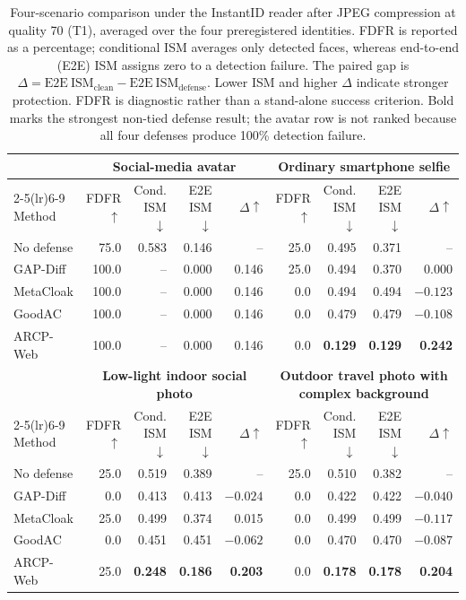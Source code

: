 \begin{table}[t]
\centering
\caption{Four-scenario comparison under the InstantID reader after JPEG
compression at quality 70 (T1), averaged over the four preregistered identities.
FDFR is reported as a percentage; conditional ISM averages only detected faces,
whereas end-to-end (E2E) ISM assigns zero to a detection failure.  The paired
gap is $\Delta=\mathrm{E2E\ ISM}_{\mathrm{clean}}-
\mathrm{E2E\ ISM}_{\mathrm{defense}}$.  Lower ISM and higher $\Delta$ indicate
stronger protection.  FDFR is diagnostic rather than a stand-alone success
criterion.  Bold marks the strongest non-tied defense result; the avatar row is
not ranked because all four defenses produce 100\% detection failure.}
\label{tab:web4-t1-scenarios}
\footnotesize
\renewcommand{\arraystretch}{1.16}
\setlength{\tabcolsep}{3.0pt}
\begin{tabular}{lrrrrrrrr}
\toprule
& \multicolumn{4}{c}{\textbf{Social-media avatar}} &
  \multicolumn{4}{c}{\textbf{Ordinary smartphone selfie}} \\
\cmidrule(lr){2-5}\cmidrule(lr){6-9}
Method & FDFR $\uparrow$ & Cond. ISM $\downarrow$ & E2E ISM $\downarrow$ & $\Delta\uparrow$
       & FDFR $\uparrow$ & Cond. ISM $\downarrow$ & E2E ISM $\downarrow$ & $\Delta\uparrow$ \\
\midrule
No defense & 75.0 & 0.583 & 0.146 & -- & 25.0 & 0.495 & 0.371 & -- \\
GAP-Diff   & 100.0 & -- & 0.000 & 0.146 & 25.0 & 0.494 & 0.370 & 0.000 \\
MetaCloak  & 100.0 & -- & 0.000 & 0.146 &  0.0 & 0.494 & 0.494 & $-0.123$ \\
GoodAC     & 100.0 & -- & 0.000 & 0.146 &  0.0 & 0.479 & 0.479 & $-0.108$ \\
ARCP-Web   & 100.0 & -- & 0.000 & 0.146 &  0.0 & \textbf{0.129} & \textbf{0.129} & \textbf{0.242} \\
\midrule
& \multicolumn{4}{c}{\textbf{Low-light indoor social photo}} &
  \multicolumn{4}{c}{\textbf{Outdoor travel photo with complex background}} \\
\cmidrule(lr){2-5}\cmidrule(lr){6-9}
Method & FDFR $\uparrow$ & Cond. ISM $\downarrow$ & E2E ISM $\downarrow$ & $\Delta\uparrow$
       & FDFR $\uparrow$ & Cond. ISM $\downarrow$ & E2E ISM $\downarrow$ & $\Delta\uparrow$ \\
\midrule
No defense & 25.0 & 0.519 & 0.389 & -- & 25.0 & 0.510 & 0.382 & -- \\
GAP-Diff   &  0.0 & 0.413 & 0.413 & $-0.024$ &  0.0 & 0.422 & 0.422 & $-0.040$ \\
MetaCloak  & 25.0 & 0.499 & 0.374 & 0.015 &  0.0 & 0.499 & 0.499 & $-0.117$ \\
GoodAC     &  0.0 & 0.451 & 0.451 & $-0.062$ &  0.0 & 0.470 & 0.470 & $-0.087$ \\
ARCP-Web   & 25.0 & \textbf{0.248} & \textbf{0.186} & \textbf{0.203}
           &  0.0 & \textbf{0.178} & \textbf{0.178} & \textbf{0.204} \\
\bottomrule
\end{tabular}
\end{table}
